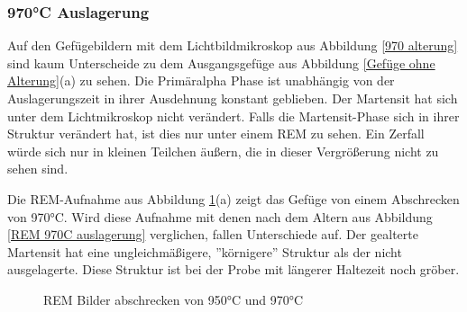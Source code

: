 \documentclass[a4paper, 11pt]{tubsreprt}
\begin{document}
\subsubsection{970°C Auslagerung}
Auf den Gefügebildern mit dem Lichtbildmikroskop aus Abbildung \ref{970 alterung} sind kaum Unterscheide zu dem Ausgangsgefüge aus Abbildung \ref{Gefüge ohne Alterung}(a) zu sehen. Die Primäralpha Phase ist unabhängig von der Auslagerungszeit in ihrer Ausdehnung konstant geblieben. Der Martensit hat sich unter dem Lichtmikroskop nicht verändert. Falls die Martensit-Phase sich in ihrer Struktur verändert hat, ist dies nur unter einem REM zu sehen. Ein Zerfall würde sich nur in kleinen Teilchen äußern, die in dieser Vergrößerung nicht zu sehen sind. 


Die REM-Aufnahme aus Abbildung \ref{REM 970C und 950C}(a) zeigt das Gefüge von einem Abschrecken von 970°C. Wird diese Aufnahme mit denen nach dem Altern aus Abbildung \ref{REM 970C auslagerung} verglichen, fallen Unterschiede auf. Der gealterte Martensit hat eine ungleichmäßigere, ''körnigere''  Struktur als der nicht ausgelagerte. Diese Struktur ist bei der Probe mit längerer Haltezeit noch gröber. 
\begin{figure}
\caption{REM Bilder abschrecken von 950°C und 970°C}
\label{REM 970C und 950C}
\end{figure}
\end{document}
